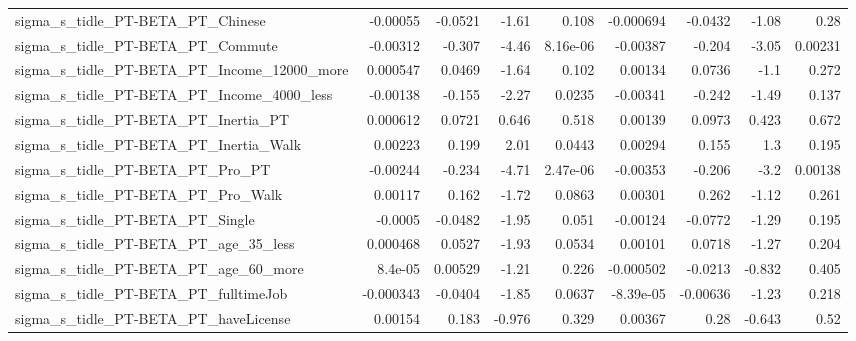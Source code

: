 \begin{tabular}{lrrrrrrrr}
sigma\_s\_tidle\_PT-BETA\_PT\_Chinese                   &    -0.00055 &      -0.0521 &    -1.61 &    0.108 &  -0.000694 &     -0.0432 &        -1.08 &          0.28 \\
sigma\_s\_tidle\_PT-BETA\_PT\_Commute                   &    -0.00312 &       -0.307 &    -4.46 & 8.16e-06 &   -0.00387 &      -0.204 &        -3.05 &       0.00231 \\
sigma\_s\_tidle\_PT-BETA\_PT\_Income\_12000\_more         &    0.000547 &       0.0469 &    -1.64 &    0.102 &    0.00134 &      0.0736 &         -1.1 &         0.272 \\
sigma\_s\_tidle\_PT-BETA\_PT\_Income\_4000\_less          &    -0.00138 &       -0.155 &    -2.27 &   0.0235 &   -0.00341 &      -0.242 &        -1.49 &         0.137 \\
sigma\_s\_tidle\_PT-BETA\_PT\_Inertia\_PT                &    0.000612 &       0.0721 &    0.646 &    0.518 &    0.00139 &      0.0973 &        0.423 &         0.672 \\
sigma\_s\_tidle\_PT-BETA\_PT\_Inertia\_Walk              &     0.00223 &        0.199 &     2.01 &   0.0443 &    0.00294 &       0.155 &          1.3 &         0.195 \\
sigma\_s\_tidle\_PT-BETA\_PT\_Pro\_PT                    &    -0.00244 &       -0.234 &    -4.71 & 2.47e-06 &   -0.00353 &      -0.206 &         -3.2 &       0.00138 \\
sigma\_s\_tidle\_PT-BETA\_PT\_Pro\_Walk                  &     0.00117 &        0.162 &    -1.72 &   0.0863 &    0.00301 &       0.262 &        -1.12 &         0.261 \\
sigma\_s\_tidle\_PT-BETA\_PT\_Single                    &     -0.0005 &      -0.0482 &    -1.95 &    0.051 &   -0.00124 &     -0.0772 &        -1.29 &         0.195 \\
sigma\_s\_tidle\_PT-BETA\_PT\_age\_35\_less               &    0.000468 &       0.0527 &    -1.93 &   0.0534 &    0.00101 &      0.0718 &        -1.27 &         0.204 \\
sigma\_s\_tidle\_PT-BETA\_PT\_age\_60\_more               &     8.4e-05 &      0.00529 &    -1.21 &    0.226 &  -0.000502 &     -0.0213 &       -0.832 &         0.405 \\
sigma\_s\_tidle\_PT-BETA\_PT\_fulltimeJob               &   -0.000343 &      -0.0404 &    -1.85 &   0.0637 &  -8.39e-05 &    -0.00636 &        -1.23 &         0.218 \\
sigma\_s\_tidle\_PT-BETA\_PT\_haveLicense               &     0.00154 &        0.183 &   -0.976 &    0.329 &    0.00367 &        0.28 &       -0.643 &          0.52 \\

\end{tabular}
